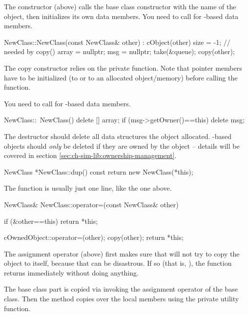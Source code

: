 The constructor (above) calls the base class constructor with
the name of the object, then initializes its own data members.
You need to call  for -based data members.

\begin{cpp}
NewClass::NewClass(const NewClass& other) : cObject(other)
{
    size = -1; // needed by copy()
    array = nullptr;
    msg = nullptr;
    take(&queue);
    copy(other);
}
\end{cpp}

The copy constructor relies on the private  function.
Note that pointer members have to be initialized (to  or to an
allocated object/memory) before calling the  function.

You need to call  for -based data members.

\begin{cpp}
NewClass::~NewClass()
{
    delete [] array;
    if (msg->getOwner()==this)
        delete msg;
}
\end{cpp}

The destructor should delete all data structures the object allocated.
-based objects should \textit{only} be deleted if they
are owned by the object -- details will be covered in section
\ref{sec:ch-sim-lib:ownership-management}.

\begin{cpp}
NewClass *NewClass::dup() const
{
    return new NewClass(*this);
}
\end{cpp}

The  function  is usually just one line, like the one above.

\begin{cpp}
NewClass& NewClass::operator=(const NewClass& other)
{
    if (&other==this)
        return *this;

    cOwnedObject::operator=(other);
    copy(other);
    return *this;
}
\end{cpp}

The assignment operator (above) first makes sure that will not try to copy
the object to itself, because that can be disastrous. If so (that is,
), the function returns immediately without doing anything.

The base class part is copied via invoking the assignment operator of
the base class. Then the method copies over the local members using the
 private utility function.

